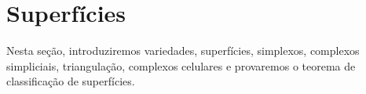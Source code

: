 \section{Superfícies}
\label{superficies}


Nesta seção, introduziremos variedades, superfícies, simplexos, complexos simpliciais, triangulação, complexos celulares e provaremos o teorema de classificação de superfícies.











